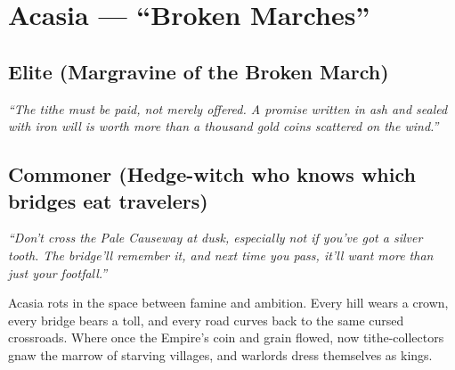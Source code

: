 \section{Acasia --- ``Broken Marches''}
\label{chap:acasia}

\subsection*{Elite (Margravine of the Broken March)}
\textit{``The tithe must be paid, not merely offered. A promise written in ash and sealed with iron will is worth more than a thousand gold coins scattered on the wind.''}

\subsection*{Commoner (Hedge-witch who knows which bridges eat travelers)}
\textit{``Don't cross the Pale Causeway at dusk, especially not if you've got a silver tooth. The bridge'll remember it, and next time you pass, it'll want more than just your footfall.''}

\begin{tcolorbox}[colback=black!3,colframe=black!40!white,title={Famine \& Ambition}]
Acasia rots in the space between famine and ambition. Every hill wears a crown, every bridge bears a toll, and every road curves back to the same cursed crossroads. Where once the Empire's coin and grain flowed, now tithe-collectors gnaw the marrow of starving villages, and warlords dress themselves as kings.
\end{tcolorbox}

